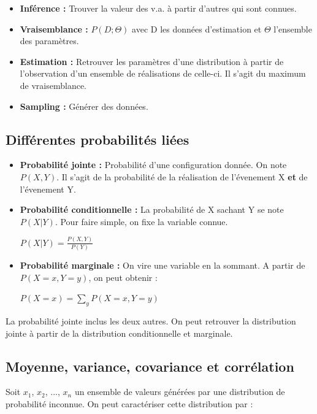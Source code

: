 \documentclass{article}
\begin{document}
\begin{itemize}
\item \textbf{Inférence :} Trouver la valeur des v.a. à partir d'autres qui sont connues.

\item \textbf{Vraisemblance :} $P(D; \Theta)$ avec D les données d'estimation et $\Theta$ l'ensemble des paramètres.

\item \textbf{Estimation :} Retrouver les paramètres d'une distribution à partir de l'observation d'un ensemble de réalisations de celle-ci. Il s'agit du maximum de vraisemblance.

\item \textbf{Sampling :} Générer des données.

\end{itemize}

\subsection{Différentes probabilités liées}

\begin{itemize}

\item \textbf{Probabilité jointe :} Probabilité d'une configuration donnée. On note $P(X, Y)$. Il s'agit de la probabilité de la réalisation de l'évenement X \textbf{et} de l'évenement Y.

\item \textbf{Probabilité conditionnelle :} La probabilité de X sachant Y se note $P(X|Y)$. Pour faire simple, on fixe la variable connue.

$ P(X|Y) = \frac{P(X, Y)}{P(Y)} $
 
\item \textbf{Probabilité marginale :} On vire une variable en la sommant. A partir de $P(X = x, Y = y)$, on peut obtenir :

$ P(X = x) = \sum_{y} P(X = x, Y = y) $

\end{itemize}

La probabilité jointe inclus les deux autres. On peut retrouver la distribution jointe à partir de la distribution conditionnelle et
marginale.


\subsection{Moyenne, variance, covariance et corrélation}

Soit $x_1$, $x_2$, ..., $x_n$ un ensemble de valeurs générées par une distribution de probabilité inconnue. On peut caractériser cette distribution par : 
\end{document}
